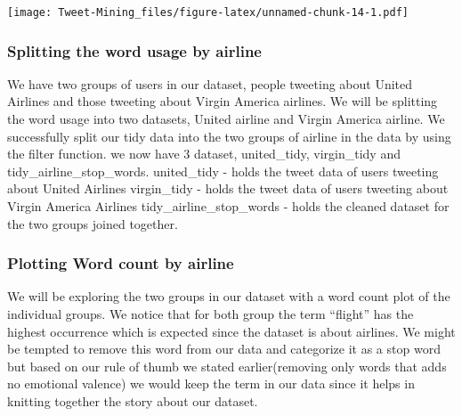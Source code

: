 \documentclass[
]{article}
\newenvironment{Shaded}{\begin{snugshade}}{\end{snugshade}}
\newcommand{\KeywordTok}[1]{\textcolor[rgb]{0.13,0.29,0.53}{\textbf{#1}}}
\newcommand{\NormalTok}[1]{#1}
\newcommand{\OperatorTok}[1]{\textcolor[rgb]{0.81,0.36,0.00}{\textbf{#1}}}
\newcommand{\StringTok}[1]{\textcolor[rgb]{0.31,0.60,0.02}{#1}}
\begin{document}
\texttt{[image: Tweet-Mining\_files/figure-latex/unnamed-chunk-14-1.pdf]}

\hypertarget{splitting-the-word-usage-by-airline}{%
\subsubsection{Splitting the word usage by
airline}\label{splitting-the-word-usage-by-airline}}

We have two groups of users in our dataset, people tweeting about United
Airlines and those tweeting about Virgin America airlines. We will be
splitting the word usage into two datasets, United airline and Virgin
America airline. We successfully split our tidy data into the two groups
of airline in the data by using the filter function. we now have 3
dataset, united\_tidy, virgin\_tidy and tidy\_airline\_stop\_words.
united\_tidy - holds the tweet data of users tweeting about United
Airlines virgin\_tidy - holds the tweet data of users tweeting about
Virgin America Airlines tidy\_airline\_stop\_words - holds the cleaned
dataset for the two groups joined together.

\begin{Shaded}
\end{Shaded}

\hypertarget{plotting-word-count-by-airline}{%
\subsubsection{Plotting Word count by
airline}\label{plotting-word-count-by-airline}}

We will be exploring the two groups in our dataset with a word count
plot of the individual groups. We notice that for both group the term
``flight'' has the highest occurrence which is expected since the
dataset is about airlines. We might be tempted to remove this word from
our data and categorize it as a stop word but based on our rule of thumb
we stated earlier(removing only words that adds no emotional valence) we
would keep the term in our data since it helps in knitting together the
story about our dataset.
\end{document}
